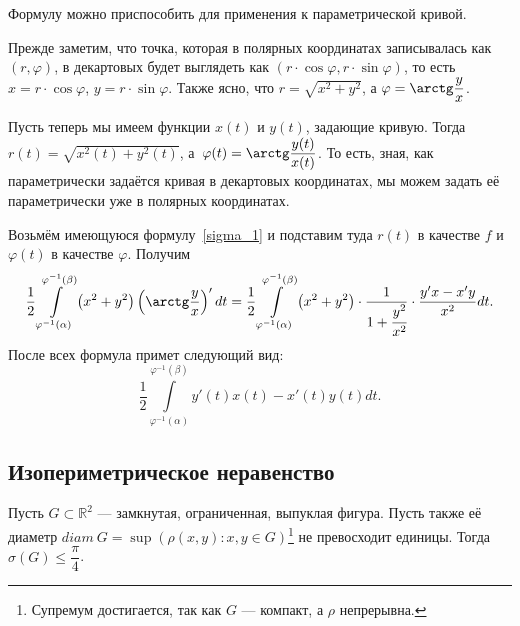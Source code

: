 \begin{remark}
	Формулу можно приспособить для применения к параметрической кривой.
	
	Прежде заметим, что точка, которая в полярных координатах записывалась как \((r, \varphi)\), в декартовых будет выглядеть как \((r \cdot \cos \varphi, r \cdot \sin \varphi)\), то есть \(x = r \cdot \cos \varphi\), \(y = r \cdot \sin \varphi\). Также ясно, что \(r = \sqrt{x^2 + y^2}\), а \(\varphi = \arctg \dfrac{y}{x}\).
	
	Пусть теперь мы имеем функции \(x(t)\) и \(y(t)\), задающие кривую. Тогда \(r(t) = \sqrt{x^2(t) + y^2(t)}\), а~\(\varphi(t) = \arctg \dfrac{y(t)}{x(t)}\). То есть, зная, как параметрически задаётся кривая в декартовых координатах, мы можем задать её параметрически уже в полярных координатах.
	
	Возьмём имеющуюся формулу~\eqref{sigma_1} и подставим туда \(r(t)\) в качестве \(f\) и \(\varphi(t)\) в качестве \(\varphi\).  Получим \[
	\frac{1}{2}\int\limits_{\varphi^{-1}(\alpha)}^{\varphi^{-1}(\beta)} \left(x^2 + y^2 \right) \left(\arctg \frac{y}{x}\right)' dt
	= \frac{1}{2}\int\limits_{\varphi^{-1}(\alpha)}^{\varphi^{-1}(\beta)} \left(x^2 + y^2 \right) \cdot \frac{1}{1 + \cfrac{y^2}{x^2}} \cdot \frac{y'x - x'y}{x^2} dt.
	\]
	После всех формула примет следующий вид: \[
	\frac{1}{2}\int\limits_{\varphi^{-1}(\alpha)}^{\varphi^{-1}(\beta)} y'(t)x(t) - x'(t)y(t) dt.
	\]
\end{remark}

\subsection{Изопериметрическое неравенство}

\begin{example}
	Пусть \(G \subset \mathbb{R}^2\) --- замкнутая, ограниченная, выпуклая фигура. Пусть также её диаметр \(diam \ G = \sup \left(\rho(x, y) : x, y \in G \right)\)\footnote{Супремум достигается, так как \(G\) --- компакт, а \(\rho\) непрерывна.} не превосходит единицы. Тогда \(\sigma(G) \leqslant \dfrac{\pi}{4}\).
\end{example}

